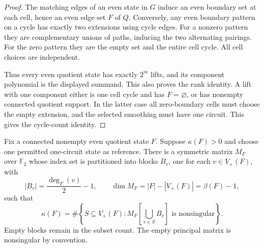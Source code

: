 \begin{proof}
The matching edges of an even state in $G$ induce an even boundary set at each cell, hence an even edge set $F$ of $Q$.
Conversely, any even boundary pattern on a cycle has exactly two extensions using cycle edges.
For a nonzero pattern they are complementary unions of paths, inducing the two alternating pairings.
For the zero pattern they are the empty set and the entire cell cycle.
All cell choices are independent.

Thus every even quotient state has exactly $2^m$ lifts, and its component polynomial is the displayed summand.
This also proves the rank identity.
A lift with one component either is one cell cycle and has $F=\varnothing$, or has nonempty connected quotient support.
In the latter case all zero-boundary cells must choose the empty extension, and the selected smoothing must have one circuit.
This gives the cycle-count identity.
\end{proof}

\begin{proposition}
\label{prop:random-cycle-cell-interlace}
Fix a connected nonempty even quotient state $F$.
Suppose $\kappa(F)>0$ and choose one permitted one-circuit state as reference.
There is a symmetric matrix $M_F$ over $\mathbb F_2$ whose index set is partitioned into blocks $B_v$, one for each $v\in V_+(F)$, with
\[
 |B_v|=\frac{\deg_F(v)}2-1,
 \qquad
 \dim M_F=|F|-|V_+(F)|=\beta(F)-1,
\]
such that
\[
 \kappa(F)=
 \#\left\{
 S\subseteq V_+(F):
 M_F\!\left[\bigcup_{v\in S}B_v\right]\text{ is nonsingular}
 \right\}.
\]
Empty blocks remain in the subset count.
The empty principal matrix is nonsingular by convention.
\end{proposition}

